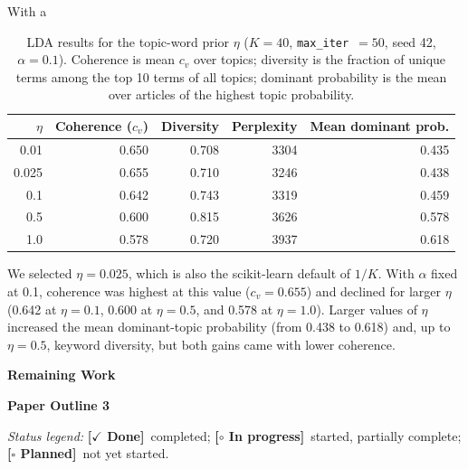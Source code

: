\documentclass[conference]{IEEEtran}
\newcommand{\done}{\textcolor{green!40!black}{\textbf{[$\checkmark$ Done]}}}
\newcommand{\wip}{\textcolor{orange!70!black}{\textbf{[$\circ$ In progress]}}}
\newcommand{\planned}{\textcolor{blue!60!black}{\textbf{[$\square$ Planned]}}}
\begin{document}
With a

\begin{table}[ht]
\centering
\caption{LDA results for the topic-word prior $\eta$ ($K=40$, \texttt{max\_iter}~$=50$, seed 42, $\alpha = 0.1$). Coherence is mean $c_v$ over topics; diversity is the fraction of unique terms among the top 10 terms of all topics; dominant probability is the mean over articles of the highest topic probability.}
\label{tab:eta}
\begin{tabular}{rrrrr}
\hline
$\eta$ & Coherence ($c_v$) & Diversity & Perplexity & Mean dominant prob. \\
\hline
0.01  & 0.650 & 0.708 & 3304 & 0.435 \\
0.025 & 0.655 & 0.710 & 3246 & 0.438 \\
0.1   & 0.642 & 0.743 & 3319 & 0.459 \\
0.5   & 0.600 & 0.815 & 3626 & 0.578 \\
1.0   & 0.578 & 0.720 & 3937 & 0.618 \\
\hline
\end{tabular}
\end{table}

We selected $\eta = 0.025$, which is also the scikit-learn default of $1/K$. With $\alpha$ fixed at 0.1, coherence was highest at this value ($c_v = 0.655$) and declined for larger $\eta$ (0.642 at $\eta = 0.1$, 0.600 at $\eta = 0.5$, and 0.578 at $\eta = 1.0$). Larger values of $\eta$ increased the mean dominant-topic probability (from 0.438 to 0.618) and, up to $\eta = 0.5$, keyword diversity, but both gains came with lower coherence.

\begin{center}\large\textbf{Remaining Work}\end{center}

\begin{center}\large\textbf{Paper Outline 3}\end{center}
\noindent\emph{Status legend:} \done~completed;
\wip~started, partially complete; \planned~not yet started.
\end{document}
